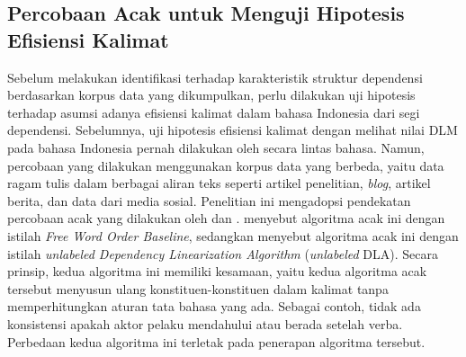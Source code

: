 \subsection{Percobaan Acak untuk Menguji Hipotesis Efisiensi Kalimat}
Sebelum melakukan identifikasi terhadap karakteristik struktur dependensi berdasarkan korpus data yang dikumpulkan, perlu dilakukan uji hipotesis terhadap asumsi adanya efisiensi kalimat dalam bahasa Indonesia dari segi dependensi. Sebelumnya, uji hipotesis efisiensi kalimat dengan melihat nilai DLM pada bahasa Indonesia pernah dilakukan oleh \cite{futrell2015large} secara lintas bahasa. Namun, percobaan yang dilakukan \cite{futrell2015large} menggunakan korpus data yang berbeda, yaitu data ragam tulis dalam berbagai aliran teks seperti artikel penelitian, \textit{blog}, artikel berita, dan data dari media sosial. Penelitian ini mengadopsi pendekatan percobaan acak yang dilakukan oleh \cite{futrell2015large} dan \cite{gildea2010grammars}. \cite{futrell2015large} menyebut algoritma acak ini dengan istilah \textit{Free Word Order Baseline}, sedangkan \cite{gildea2010grammars} menyebut algoritma acak ini dengan istilah \textit{unlabeled Dependency Linearization Algorithm} (\textit{unlabeled} DLA). Secara prinsip, kedua algoritma ini memiliki kesamaan, yaitu kedua algoritma acak tersebut menyusun ulang konstituen-konstituen dalam kalimat tanpa memperhitungkan aturan tata bahasa yang ada. Sebagai contoh, tidak ada konsistensi apakah aktor pelaku mendahului atau berada setelah verba. Perbedaan kedua algoritma ini terletak pada penerapan algoritma tersebut. 

